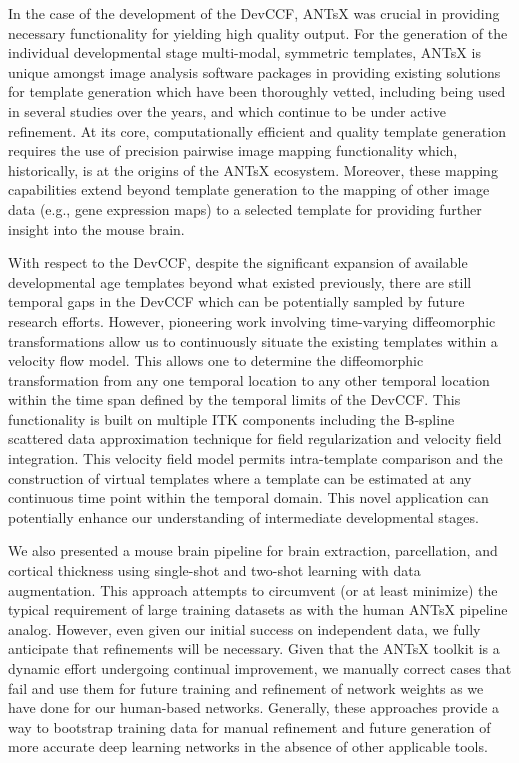 \documentclass[
  12pt,
]{article}
\begin{document}
In the case of the development of the DevCCF, ANTsX was crucial in
providing necessary functionality for yielding high quality output. For
the generation of the individual developmental stage multi-modal,
symmetric templates, ANTsX is unique amongst image analysis software
packages in providing existing solutions for template generation which
have been thoroughly vetted, including being used in several studies
over the years, and which continue to be under active refinement. At its
core, computationally efficient and quality template generation requires
the use of precision pairwise image mapping functionality which,
historically, is at the origins of the ANTsX ecosystem. Moreover, these
mapping capabilities extend beyond template generation to the mapping of
other image data (e.g., gene expression maps) to a selected template for
providing further insight into the mouse brain.

With respect to the DevCCF, despite the significant expansion of
available developmental age templates beyond what existed previously,
there are still temporal gaps in the DevCCF which can be potentially
sampled by future research efforts. However, pioneering work involving
time-varying diffeomorphic transformations allow us to continuously
situate the existing templates within a velocity flow model. This allows
one to determine the diffeomorphic transformation from any one temporal
location to any other temporal location within the time span defined by
the temporal limits of the DevCCF. This functionality is built on
multiple ITK components including the B-spline scattered data
approximation technique for field regularization and velocity field
integration. This velocity field model permits intra-template comparison
and the construction of virtual templates where a template can be
estimated at any continuous time point within the temporal domain. This
novel application can potentially enhance our understanding of
intermediate developmental stages.

We also presented a mouse brain pipeline for brain extraction,
parcellation, and cortical thickness using single-shot and two-shot
learning with data augmentation. This approach attempts to circumvent
(or at least minimize) the typical requirement of large training
datasets as with the human ANTsX pipeline analog. However, even given
our initial success on independent data, we fully anticipate that
refinements will be necessary. Given that the ANTsX toolkit is a dynamic
effort undergoing continual improvement, we manually correct cases that
fail and use them for future training and refinement of network weights
as we have done for our human-based networks. Generally, these
approaches provide a way to bootstrap training data for manual
refinement and future generation of more accurate deep learning networks
in the absence of other applicable tools.
\end{document}
